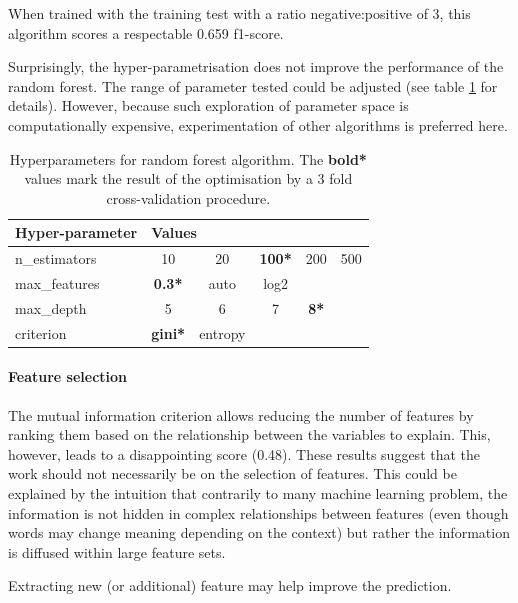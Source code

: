 \documentclass[a4paper]{tufte-handout}
\begin{document}
\begin{fullwidth}
When trained with the training test with a ratio negative:positive of 3, this algorithm scores a respectable 0.659 f1-score.

Surprisingly, the hyper-parametrisation does not improve the performance of the random forest. The range of parameter tested could be adjusted (see table \ref{RF-HP} for details). However, because such exploration of parameter space is computationally expensive, experimentation of other algorithms is preferred here.

\begin{table}[]\label{RF-HP}
\begin{tabular}{l|ccccc}
Hyper-parameter & \multicolumn{5}{l}{Values}                                  \\ \hline
n\_estimators   & 10             & 20      & \textbf{100*} & 200         & 500 \\
max\_features   & \textbf{0.3*}  & auto    & log2          &             &     \\
max\_depth      & 5              & 6       & 7             & \textbf{8*} &     \\
criterion       & \textbf{gini*} & entropy &               &             &     \\ 
\end{tabular}
\caption{Hyperparameters for random forest algorithm. The \textbf{bold*} values mark the result of the optimisation by a 3 fold cross-validation procedure.}
\end{table}


\paragraph{Feature selection}

The mutual information criterion allows reducing the number of features by ranking them based on the relationship between the variables to explain. This, however, leads to a disappointing score (0.48). These results suggest that the work should not necessarily be on the selection of features. This could be explained by the intuition that contrarily to many machine learning problem, the information is not hidden in complex relationships between features (even though words may change meaning depending on the context) but rather the information is diffused within large feature sets.

Extracting new (or additional) feature may help improve the prediction. 


\end{fullwidth}
\end{document}
